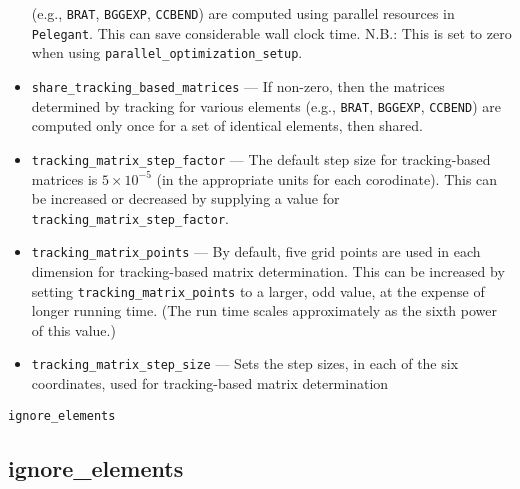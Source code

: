 \documentclass[11pt]{article}
\begin{document}
\begin{itemize}
  (e.g., \verb|BRAT|, \verb|BGGEXP|, \verb|CCBEND|) are computed using parallel resources in \verb|Pelegant|. 
  This can save considerable wall clock time.
  N.B.: This is set to zero when using \verb|parallel_optimization_setup|.
\item \verb|share_tracking_based_matrices| --- If non-zero, then the matrices determined by tracking for various elements
  (e.g., \verb|BRAT|, \verb|BGGEXP|, \verb|CCBEND|) are computed only once for a set of identical elements, then shared.
\item \verb|tracking_matrix_step_factor| --- The default step size for tracking-based matrices is $5 \times 10^{-5}$ 
  (in the appropriate units for each corodinate). This can be increased or decreased by supplying a value for 
  \verb|tracking_matrix_step_factor|.
\item \verb|tracking_matrix_points| --- By default, five grid points are used in each dimension for tracking-based matrix determination.
  This can be increased by setting \verb|tracking_matrix_points| to a larger, odd value, at the expense of longer running time.
  (The run time scales approximately as the sixth power of this value.)
\item \verb|tracking_matrix_step_size| --- Sets the step sizes, in each of the six coordinates,
  used for tracking-based matrix determination
\end{itemize}


\newpage
\begin{center}{\Large\verb|ignore_elements|}\end{center}
\subsection{ignore\_elements \label{subsec:ignoreelements}}
\end{document}
